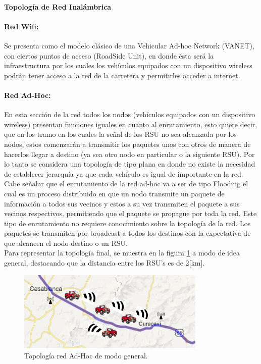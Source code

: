 \documentclass[12pt]{article}
\begin{document}
\paragraph{Topología de Red Inalámbrica}
\paragraph{Red Wifi:} 
Se presenta como el modelo clásico de una Vehicular Ad-hoc Network (VANET), con ciertos puntos de acceso 
(RoadSide Unit), en donde ésta será la infraestructura por los cuales los vehículos equipados con un
dispositivo wireless podrán tener acceso a la red de la carretera y permitirles acceder a internet.

\newpage
\paragraph{Red Ad-Hoc:}
En esta sección de la red todos los nodos (vehículos equipados con un dispositivo wireless) presentan 
funciones iguales en cuanto al enrutamiento, esto quiere decir, que en los tramo en los cuales la señal de 
los RSU no sea alcanzada por los nodos, estos comenzarán a transmitir los paquetes unos con otros de manera 
de hacerlos llegar a destino (ya sea otro nodo en particular o la siguiente RSU). Por lo tanto se considera 
una topología de tipo plana en donde no existe la necesidad de establecer jerarquía ya que cada vehículo es 
igual de importante en la red.\\

Cabe señalar que el enrutamiento de la red ad-hoc va a ser de tipo Flooding el cual es un proceso 
distribuido en que un nodo transmite un paquete de información a todos sus vecinos y estos a su vez 
transmiten el paquete a sus vecinos respectivos, permitiendo que el paquete se propague por toda la red. 
Este tipo de enrutamiento no requiere conocimiento sobre la topología de la red. Los paquetes se 
transmiten por broadcast a todos los destinos con la expectativa de que alcancen el nodo destino o un RSU.\\

Para representar la topología final, se muestra en la figura \ref{fig:plano_autos} a modo de idea general,
destacando que la distancia entre los RSU's es de 2[km].\\
\begin{figure}[H]
  \centering
      \includegraphics[width=0.8\textwidth]{plano_autos}
	    \caption{Topología red Ad-Hoc de modo general.}
	\label{fig:plano_autos}
\end{figure}
\end{document}
